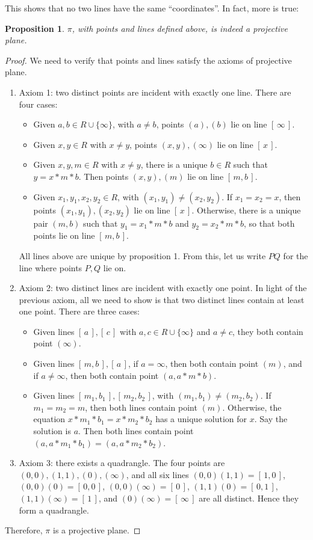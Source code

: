 \documentclass[12pt]{article}
\newtheorem{prop}{Proposition}
\begin{document}
This shows that no two lines have the same ``coordinates''.  In fact, more is true:

\begin{prop} $\pi$, with points and lines defined above, is indeed a projective plane. \end{prop}
\begin{proof}  We need to verify that points and lines satisfy the axioms of projective plane.
\begin{enumerate}
\item Axiom 1: two distinct points are incident with exactly one line.  There are four cases:
\begin{itemize}
\item Given $a,b\in R\cup \lbrace \infty \rbrace$, with $a\ne b$, points $(a),(b)$ lie on line $[\,\infty\,]$.
\item Given $x,y \in R$ with $x\ne y$, points $(x,y),(\infty)$ lie on line $[\,x\,]$.
\item Given $x,y, m\in R$ with $x\ne y$, there is a unique $b\in R$ such that $y=x*m*b$.  Then points $(x,y),(m)$ lie on line $[\,m,b\,]$.
\item Given $x_1,y_1,x_2,y_2\in R$, with $(x_1,y_1)\ne (x_2,y_2)$.  If $x_1=x_2=x$, then points $(x_1,y_1),(x_2,y_2)$ lie on line $[\,x\,]$.  Otherwise, there is a unique pair $(m,b)$ such that $y_1=x_1*m*b$ and $y_2=x_2*m*b$, so that both points lie on line $[\,m,b\,]$.
\end{itemize}
All lines above are unique by proposition 1.  From this, let us write $PQ$ for the line where points $P,Q$ lie on.
\item Axiom 2: two distinct lines are incident with exactly one point.  In light of the previous axiom, all we need to show is that two distinct lines contain at least one point.  There are three cases:
\begin{itemize}
\item Given lines $[\,a\,],[\,c\,]$ with $a,c\in R\cup \lbrace \infty \rbrace$ and $a\ne c$, they both contain point $(\infty)$.
\item Given lines $[\,m,b\,],[\,a\,]$, if $a=\infty$, then both contain point $(m)$, and if $a\ne \infty$, then both contain point $(a,a*m*b)$.
\item Given lines $[\,m_1,b_1\,],[\,m_2,b_2\,]$, with $(m_1,b_1)\ne (m_2,b_2)$.  If $m_1=m_2=m$, then both lines contain point $(m)$.  Otherwise, the equation $x*m_1*b_1=x*m_2*b_2$ has a unique solution for $x$.  Say the solution is $a$.  Then both lines contain point $(a,a*m_1*b_1)=(a,a*m_2*b_2)$.
\end{itemize}
\item Axiom 3: there exists a quadrangle.  The four points are $(0,0),(1,1),(0),(\infty)$, and all six lines $(0,0)(1,1)=[\,1,0\,]$, $(0,0)(0)=[\,0,0\,]$, $(0,0)(\infty)=[\,0\,]$, $(1,1)(0)=[\,0,1\,]$, $(1,1)(\infty)=[\,1\,]$, and $(0)(\infty)=[\,\infty\,]$ are all distinct.  Hence they form a quadrangle.
\end{enumerate}
Therefore, $\pi$ is a projective plane.
\end{proof}
\end{document}
